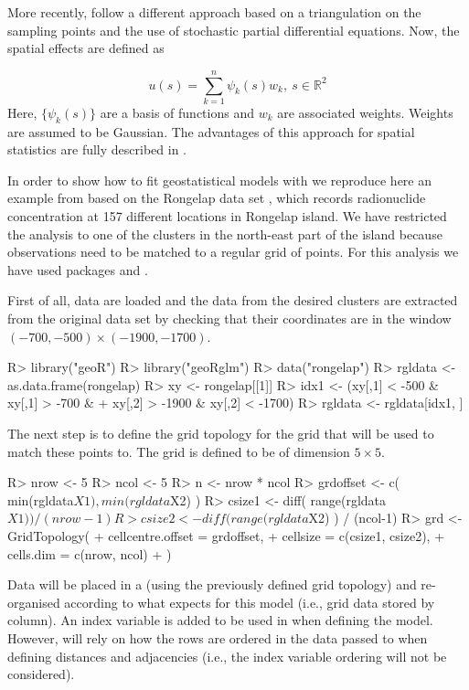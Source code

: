 \documentclass[article]{jss}
\begin{document}
More recently, \citet{Lindgren:2011} follow a different approach based on
a triangulation on the sampling points and the use of stochastic partial
differential equations. Now, the spatial effects are defined as

\begin{equation}
u(s)=\sum_{k=1}^n \psi_k(s)w_k,\ s\in \mathbb{R}^2
\end{equation}
\noindent
Here, $\{\psi_k(s)\}$ are a basis of functions and $w_k$ are associated
weights. Weights are assumed to be Gaussian. The advantages of this approach
for spatial statistics are fully described in \citet{Camelettietal:2013}.


In order to show how to fit geostatistical models with  we
reproduce here an example from \citet{GomezRubioetal:2013} based on the
Rongelap data set \citep{DiggleRibeiro:2007}, which records  radionuclide
concentration at 157 different locations in Rongelap island. We have restricted
the analysis to one of the clusters in the north-east part of the island
because observations need to be matched to a regular grid of points.  For this
analysis we have used  packages  \citep{geoR:2001} and
 \citep{geoRglm:2002}.



First of all, data are loaded and the data from the desired clusters
are extracted from the original data set by checking that their coordinates
are in the window $(-700, -500)\times (-1900, -1700)$.

\begin{Schunk}
\begin{Sinput}
R> library("geoR")
R> library("geoRglm")
R> data("rongelap")
R> rgldata <- as.data.frame(rongelap)
R> xy <- rongelap[[1]]
R> idx1 <- (xy[,1] < -500 & xy[,1] > -700 & 
+     xy[,2] > -1900 & xy[,2] < -1700)
R> rgldata <- rgldata[idx1, ]
\end{Sinput}
\end{Schunk}


The next step is to  define the grid topology for the grid that will be
used to match these points to. The grid is defined to be of dimension 
$5\times 5$. 

\begin{Schunk}
\begin{Sinput}
R> nrow <- 5
R> ncol <- 5
R> n <- nrow * ncol
R> grdoffset <- c( min(rgldata$X1), min(rgldata$X2) )
R> csize1 <- diff( range(rgldata$X1) ) / (nrow-1)
R> csize2 <- diff( range(rgldata$X2) ) / (ncol-1)
R> grd <- GridTopology(
+     cellcentre.offset = grdoffset, 
+     cellsize = c(csize1, csize2),
+     cells.dim = c(nrow, ncol)
+  )
\end{Sinput}
\end{Schunk}
\noindent
Data will be placed in a  (using the previously
defined grid topology) and re-organised according to what  expects
for this model (i.e., grid data stored by column).  An index variable 
is added to be used in  when defining the model. However, 
 will rely on how the rows are ordered in the data passed to 
 when defining distances and adjacencies (i.e., the index
variable ordering will not be considered).
\end{document}
